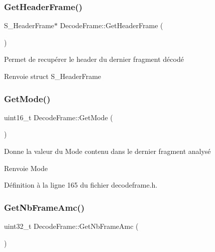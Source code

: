 \subsubsection{\texorpdfstring{Get\+Header\+Frame()}{GetHeaderFrame()}}
{\footnotesize\ttfamily S\+\_\+\+Header\+Frame$\ast$ Decode\+Frame\+::\+Get\+Header\+Frame (\begin{DoxyParamCaption}{ }\end{DoxyParamCaption})}



Permet de recupérer le header du dernier fragment décodé 

\begin{DoxyReturn}{Renvoie}
struct S\+\_\+\+Header\+Frame 
\end{DoxyReturn}
\mbox{\label{class_decode_frame_a0bb520a314a74665a0092dbbf0f32310}} 
\subsubsection{\texorpdfstring{Get\+Mode()}{GetMode()}}
{\footnotesize\ttfamily uint16\+\_\+t Decode\+Frame\+::\+Get\+Mode (\begin{DoxyParamCaption}{ }\end{DoxyParamCaption})\hspace{0.3cm}{\ttfamily [inline]}}



Donne la valeur du Mode contenu dans le dernier fragment analysé 

\begin{DoxyReturn}{Renvoie}
Mode 
\end{DoxyReturn}


Définition à la ligne 165 du fichier decodeframe.\+h.

\mbox{\label{class_decode_frame_a443f66af9144baf11fa5d5cd9c358729}} 
\subsubsection{\texorpdfstring{Get\+Nb\+Frame\+Amc()}{GetNbFrameAmc()}}
{\footnotesize\ttfamily uint32\+\_\+t Decode\+Frame\+::\+Get\+Nb\+Frame\+Amc (\begin{DoxyParamCaption}{ }\end{DoxyParamCaption})\hspace{0.3cm}{\ttfamily [inline]}}



